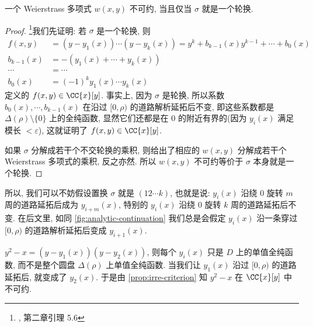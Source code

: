 \begin{prop}
\label{prop:irre-criterion}
一个 Weierstrass 多项式 $w(x,y)$ 不可约,
当且仅当 $\sigma$ 就是一个轮换.
\end{prop}

\begin{proof}
\footnote{\cite{textbook}, 第二章引理 5.6}我们先证明: 若 $\sigma$ 是一个轮换, 则
\begin{align*}
f(x,y) &= (y-y_1(x))\cdots (y-y_k(x)) = y^k + b_{k-1}(x)y^{k-1} + \cdots + b_0(x)\\
b_{k-1}(x) &= -(y_1(x) + \cdots + y_k(x))\\
\cdots &= \cdots\\
b_0(x) &= (-1)^ky_1(x)\cdots y_k(x)
\end{align*}
定义的 $f(x,y) \in \CC\{x\}[y]$.
事实上, 因为 $\sigma$ 是轮换,
所以系数 $b_0(x),\cdots, b_{k-1}(x)$ 在沿过 $[0,\rho)$ 的道路解析延拓后不变,
即这些系数都是 $\Delta(\rho)\setminus \{0\}$ 上的全纯函数,
显然它们还都是在 $0$ 的附近有界的(因为 $y_i(x)$ 满足模长 $<\varepsilon$),
这就证明了 $f(x,y) \in \CC\{x\}[y]$.

如果 $\sigma$ 分解成若干个不交轮换的乘积,
则给出了相应的 $w(x,y)$ 分解成若干个 Weierstrass 多项式的乘积,
反之亦然. 所以 $w(x,y)$ 不可约等价于 $\sigma$ 本身就是一个轮换.
\end{proof}

所以, 我们可以不妨假设置换 $\sigma$ 就是 $(12\cdots k)$,
也就是说: $y_i(x)$ 沿绕 $0$ 旋转 $m$ 周的道路延拓后成为 $y_{i+m}(x)$,
特别的 $y_i(x)$ 沿绕 $0$ 旋转 $k$ 周的道路延拓后不变.
在后文里, 如同 \cref{fig:analytic-continuation} 我们总是会假定 $y_i(x)$
沿一条穿过 $[0,\rho)$ 的道路解析延拓后变成 $y_{i+1}(x)$.

\begin{exmp}
$y^2 - x = (y-y_1(x))(y-y_2(x))$,
则每个 $y_i(x)$ 只是 $D$ 上的单值全纯函数,
而不是整个圆盘 $\Delta(\rho)$ 上单值全纯函数.
当我们让 $y_1(x)$ 沿过 $[0,\rho)$ 的道路延拓后,
就变成了 $y_2(x)$.
于是由 \cref{prop:irre-criterion} 知 $y^2 - x$ 在 $\CC\{x\}[y]$ 中不可约.
\end{exmp}

